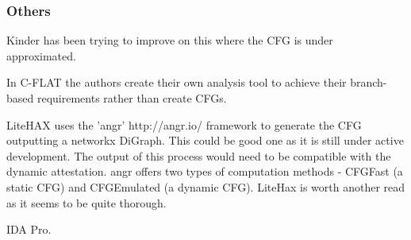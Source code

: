 \subsubsection{Others}

Kinder \cite{Kinder2012} has been trying to improve on this where the CFG is under approximated.

In C-FLAT \cite{Abera2016} the authors create their own analysis tool to achieve their branch-based requirements rather than create CFGs.

LiteHAX \cite{Dessouky2018} uses the 'angr' http://angr.io/ \cite{Shoshitaishvili2016} framework to generate the CFG outputting a networkx DiGraph. This could be good one as it is still under active development. The output of this process would need to be compatible with the dynamic attestation. angr offers two types of computation methods - CFGFast (a static CFG) and CFGEmulated (a dynamic CFG). LiteHax is worth another read as it seems to be quite thorough.

IDA Pro. 